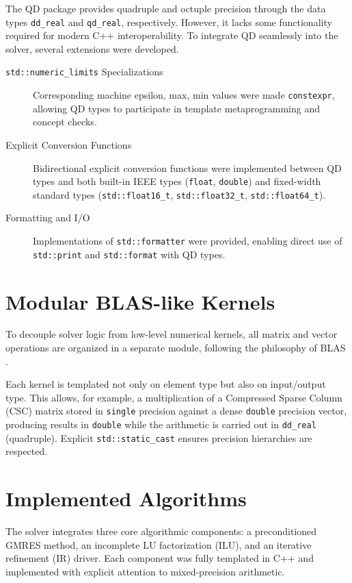 The QD package provides quadruple and octuple precision through the data types
\texttt{dd\_real} and \texttt{qd\_real}, respectively. However, it lacks some
functionality required for modern C++ interoperability. To integrate QD
seamlessly into the solver, several extensions were developed.

\begin{description}
\item[\texttt{std::numeric\_limits} Specializations] Corresponding machine epsilon, max,
  min values were made \texttt{constexpr}, allowing QD types to participate in
  template metaprogramming and concept checks.
\item[Explicit Conversion Functions] Bidirectional explicit conversion functions
  were implemented between QD types and both built-in IEEE types
  (\texttt{float}, \texttt{double}) and fixed-width standard types
  (\texttt{std::float16\_t}, \texttt{std::float32\_t},
  \texttt{std::float64\_t}).
\item [Formatting and I/O] Implementations of \texttt{std::formatter} were provided,
  enabling direct use of \texttt{std::print} and \texttt{std::format} with QD
  types.
\end{description}

\section{Modular BLAS-like Kernels}
\label{sec:modular-blas-like}

To decouple solver logic from low-level numerical kernels, all matrix and vector
operations are organized in a separate module, following the philosophy of BLAS
\cite{blackford_2002_updated}.

Each kernel is templated not only on element type but also on input/output type.
This allows, for example, a multiplication of a Compressed Sparse Column (CSC)
matrix stored in \texttt{single} precision against a dense \texttt{double}
precision vector, producing results in \texttt{double} while the arithmetic is
carried out in \texttt{dd\_real} (quadruple). Explicit
\texttt{std::static\_cast} ensures precision hierarchies are respected.

\section{Implemented Algorithms}
\label{sec:impl-algo}

The solver integrates three core algorithmic components: a preconditioned GMRES
method, an incomplete LU factorization (ILU), and an iterative refinement (IR)
driver. Each component was fully templated in C++ and implemented with explicit
attention to mixed-precision arithmetic.

